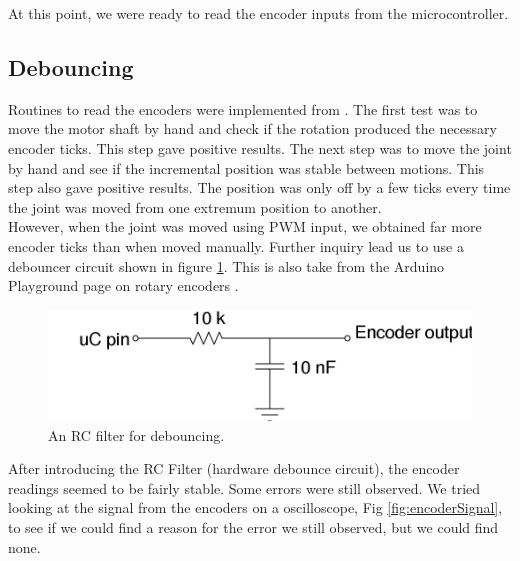 \documentclass[10pt,a4paper]{article}
\begin{document}
At this point, we were ready to read the encoder inputs from the
microcontroller. 

\subsection{Debouncing}

Routines to read the encoders were implemented from
\cite{ArduinoPlaygroundRE}.
The first test was to move the motor shaft by hand and check if the
rotation produced the necessary encoder ticks. This step gave positive
results. The next step was to move the joint by hand and see if the
incremental position was stable between motions. This step also gave
positive results. The position was only off by a few ticks every time
the joint was moved from one extremum position to another. \\

However, when the joint was moved using PWM input, we obtained far
more encoder ticks than when moved manually. Further inquiry lead us
to use a debouncer circuit shown in figure \ref{fig:rcfilter}. This is
also take from the Arduino Playground page on rotary encoders
\cite{ArduinoPlaygroundRE}.\\

\begin{figure}[H]
    \centering
    \includegraphics[scale=0.5]{debouncer.jpg}
    \caption{An RC filter for debouncing.}
    \label{fig:rcfilter}
\end{figure}

After introducing the RC Filter (hardware debounce circuit), the
encoder readings seemed to be fairly stable. Some errors were still
observed. We tried looking at the signal from the encoders on a oscilloscope, Fig \ref{fig:encoderSignal}, to see if we could find a reason for the error we still observed, but we could find none. 
\end{document}
